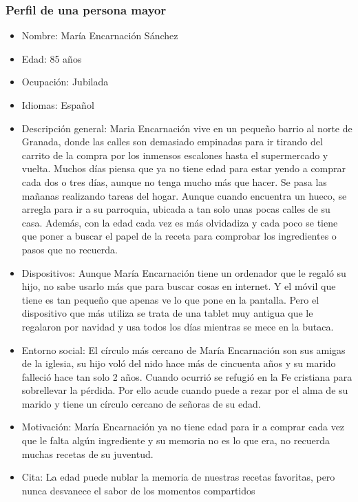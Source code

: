 \begin{enumerate}
\subsubsection{Perfil de una persona mayor}
\begin{itemize}
    \item Nombre: María Encarnación Sánchez
    \item Edad: 85 años
    \item Ocupación: Jubilada
    \item Idiomas: Español
    \item Descripción general: Maria Encarnación vive en un pequeño barrio al norte de Granada, donde las calles son demasiado empinadas para ir tirando del carrito de la compra por los inmensos escalones hasta el supermercado y vuelta. Muchos días piensa que ya no tiene edad para estar yendo a comprar cada dos o tres días, aunque no tenga mucho más que hacer. Se pasa las mañanas realizando tareas del hogar. Aunque cuando encuentra un hueco, se arregla para ir a su parroquia, ubicada a tan solo unas pocas calles de su casa. Además, con la edad cada vez es más olvidadiza y cada poco se tiene que poner a buscar el papel de la receta para comprobar los ingredientes o pasos que no recuerda.
    \item Dispositivos: Aunque María Encarnación tiene un ordenador que le regaló su hijo, no sabe usarlo más que para buscar cosas en internet. Y el móvil que tiene es tan pequeño que apenas ve lo que pone en la pantalla. Pero el dispositivo que más utiliza se trata de una tablet muy antigua que le regalaron por navidad y usa todos los días mientras se mece en la butaca.
    \item Entorno social: El círculo más cercano de María Encarnación son sus amigas de la iglesia, su hijo voló del nido hace más de cincuenta años y su marido falleció hace tan solo 2 años. Cuando ocurrió se refugió en la Fe cristiana para sobrellevar la pérdida. Por ello acude cuando puede a rezar por el alma de su marido y tiene un círculo cercano de señoras de su edad. 
    \item Motivación: María Encarnación ya no tiene edad para ir a comprar cada vez que le falta algún ingrediente y su memoria no es lo que era, no recuerda muchas recetas de su juventud.
    \item Cita: La edad puede nublar la memoria de nuestras recetas favoritas, pero nunca desvanece el sabor de los momentos compartidos
\end{itemize}


\end{enumerate}
